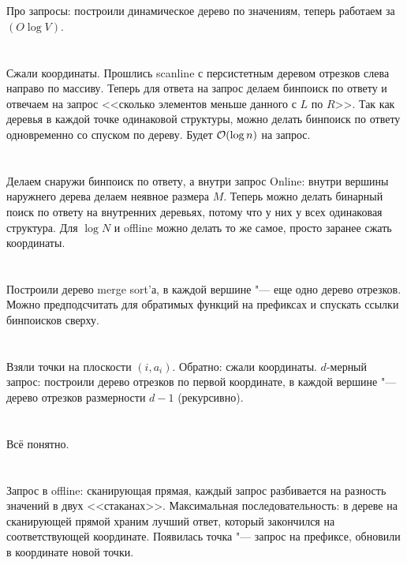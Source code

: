 \section{} %
Про запросы: построили динамическое дерево по значениям, теперь работаем за $(O\log V)$.

\section{} %
Сжали координаты.
Прошлись scanline с персистетным деревом отрезков слева направо по массиву.
Теперь для ответа на запрос делаем бинпоиск по ответу и отвечаем на запрос <<сколько элементов меньше данного с $L$ по $R$>>.
Так как деревья в каждой точке одинаковой структуры, можно делать бинпоиск по ответу одновременно со спуском по дереву.
Будет $\mathcal{O}(\log n)$ на запрос.

\section{} %
Делаем снаружи бинпоиск по ответу, а внутри запрос
Online: внутри вершины наружнего дерева делаем неявное размера $M$.
Теперь можно делать бинарный поиск по ответу на внутренних деревьях, потому что у них у всех одинаковая структура.
Для $\log N$ и offline можно делать то же самое, просто заранее сжать координаты.

\section{} %
Построили дерево merge sort'а, в каждой вершине "--- еще одно дерево отрезков.
Можно предподсчитать для обратимых функций на префиксах и спускать ссылки бинпоисков сверху.

\section{} %
Взяли точки на плоскости $(i, a_i)$.
Обратно: сжали координаты.
$d$-мерный запрос: построили дерево отрезков по первой координате, в каждой вершине "--- дерево отрезков размерности $d-1$ (рекурсивно).

\section{} %
Всё понятно.

\section{} %
Запрос в offline: сканирующая прямая, каждый запрос разбивается на разность значений в двух <<стаканах>>.
Максимальная последовательность: в дереве на сканирующей прямой храним лучший ответ, который закончился на соответствующей координате.
Появилась точка "--- запрос на префиксе, обновили в координате новой точки.

